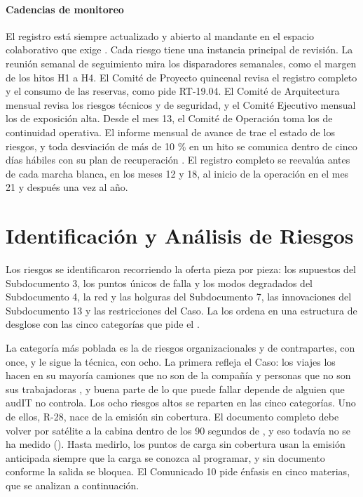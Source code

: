 \paragraph{Cadencias de monitoreo}
El registro está siempre actualizado y abierto al mandante en el espacio colaborativo que exige
. Cada riesgo tiene una instancia principal de revisión. La reunión semanal de seguimiento mira
los disparadores semanales, como el margen de los hitos H1 a H4. El Comité de Proyecto quincenal revisa
el registro completo y el consumo de las reservas, como pide RT-19.04. El Comité de Arquitectura mensual
revisa los riesgos técnicos y de seguridad, y el Comité Ejecutivo mensual los de exposición alta. Desde
el mes 13, el Comité de Operación  toma los de continuidad operativa. El informe mensual de
avance de  trae el estado de los riesgos, y toda desviación de más de 10 \% en un
hito se comunica dentro de cinco días hábiles con su plan de recuperación . El
registro completo se reevalúa antes de cada marcha blanca, en los meses 12 y 18, al inicio de la
operación en el mes 21 y después una vez al año.

\section{Identificación y Análisis de Riesgos}\label{sec:8-identificacion}

Los riesgos se identificaron recorriendo la oferta pieza por pieza: los supuestos del Subdocumento 3,
los puntos únicos de falla y los modos degradados del Subdocumento 4, la red y las holguras del
Subdocumento 7, las innovaciones del Subdocumento 13 y las restricciones del Caso. La  los
ordena en una estructura de desglose con las cinco categorías que pide el .


La categoría más poblada es la de riesgos organizacionales y de contrapartes, con once, y le sigue la
técnica, con ocho. La primera refleja el Caso: los viajes los hacen en su mayoría camiones que no son de
la compañía y personas que no son sus trabajadoras , y buena parte de lo que
puede fallar depende de alguien que audIT no controla. Los ocho riesgos altos se reparten en las cinco
categorías. Uno de ellos, R-28, nace de la emisión sin cobertura. El documento completo debe volver por
satélite a la cabina dentro de los 90 segundos de , y eso todavía no se ha medido
(). Hasta medirlo, los puntos de carga sin cobertura usan la emisión
anticipada siempre que la carga se conozca al programar, y sin documento conforme la salida se
bloquea. El Comunicado 10 pide énfasis en cinco materias, que se analizan a
continuación.

